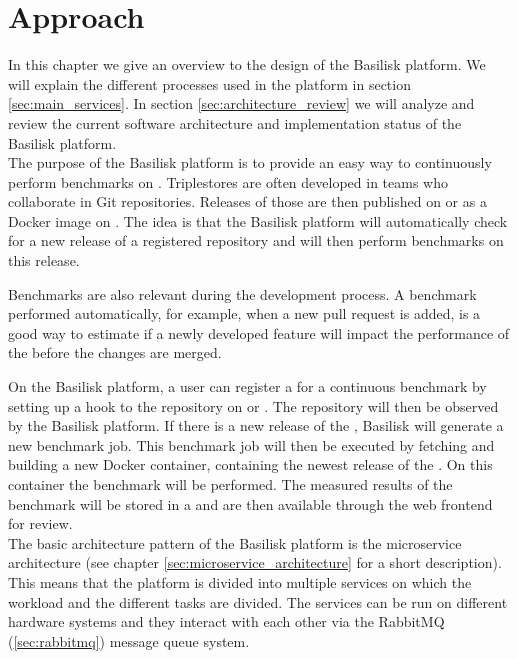 \chapter{Approach}
\label{ch:approach}

In this chapter we give an overview to the design of the Basilisk platform.
We will explain the different processes used in the platform in section \ref{sec:main_services}.
In section \ref{sec:architecture_review} we will analyze and review the current software architecture and implementation status of the Basilisk platform.
\\

The purpose of the Basilisk platform is to provide an easy way to continuously perform benchmarks on \tsp{}.
Triplestores are often developed in teams who collaborate in Git repositories.
Releases of those \tsp{} are then published on \gh{} or as a Docker image on \dockh{}.
The idea is that the Basilisk platform will automatically check for a new release of a registered \ts{} repository and will then perform benchmarks on this release.

Benchmarks are also relevant during the development process.
A benchmark performed automatically, for example, when a new pull request is added, is a good way to estimate if a newly developed feature will impact the performance of the \ts{} before the changes are merged.

On the Basilisk platform, a user can register a \ts{} for a continuous benchmark by setting up a hook to the repository on \gh{} or \dockh{}.
The repository will then be observed by the Basilisk platform.
If there is a new release of the \ts{}, Basilisk will generate a new benchmark job.
This benchmark job will then be executed by fetching and building a new Docker container, containing the newest release of the \ts{}.
On this container the benchmark will be performed.
The measured results of the benchmark will be stored in a \ts{} and are then available through the web frontend for review.
\\

The basic architecture pattern of the Basilisk platform is the microservice architecture (see chapter \ref{sec:microservice_architecture} for a short description). 
This means that the platform is divided into multiple services on which the workload and the different tasks are divided.
The services can be run on different hardware systems and they interact with each other via the RabbitMQ (\ref{sec:rabbitmq}) message queue system.
\\

